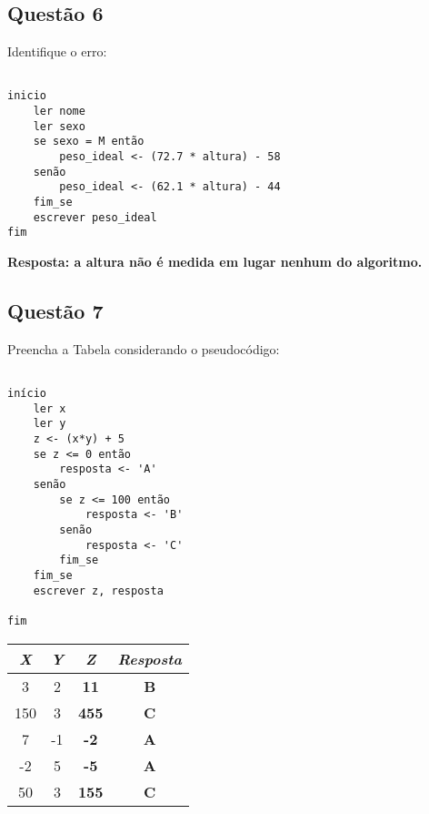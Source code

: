 \documentclass[a4paper, 12pt, onecolumn,singlespacing]{article}
\begin{document}
\subsection{Questão 6}

Identifique o erro:\begin{verbatim}
	
inicio
	ler nome
	ler sexo
	se sexo = M então
		peso_ideal <- (72.7 * altura) - 58
	senão
		peso_ideal <- (62.1 * altura) - 44
	fim_se
	escrever peso_ideal
fim
\end{verbatim}

\textbf{Resposta: a altura não é medida em lugar nenhum do algoritmo.}

\subsection{Questão 7}

	Preencha a Tabela considerando o pseudocódigo:

\begin{verbatim}

início
	ler x
	ler y
	z <- (x*y) + 5
	se z <= 0 então
		resposta <- 'A'
	senão
		se z <= 100 então
			resposta <- 'B'
		senão
			resposta <- 'C'
		fim_se
	fim_se
	escrever z, resposta

fim
\end{verbatim}

\begin{table}[ht]
	\centering
	
	\begin{tabular}{|c|c|c|c|}
		\hline
		\textbf{\textit{X}} & \textbf{\textit{Y}} & \textbf{\textit{Z}} & \textbf{\textit{Resposta}} \\
		\hline 
			3 & 2 & \textbf{11} & \textbf{B} \\
			\hline
			150 & 3 & \textbf{455} & \textbf{C} \\
			\hline
			7 & -1 & \textbf{-2} & \textbf{A} \\
			\hline
			-2 & 5 & \textbf{-5} & \textbf{A} \\
			\hline
			50 & 3 & \textbf{155} & \textbf{C} \\
			\hline

		\hline
	\end{tabular}
	
\end{table}
\end{document}
